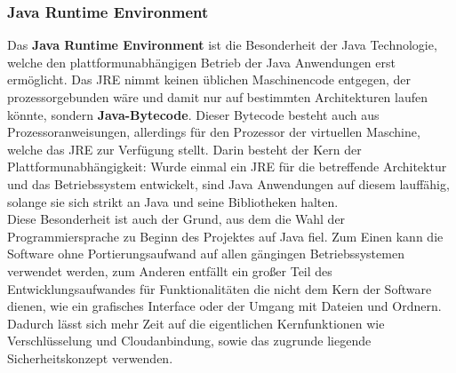 \documentclass[13pt,a4paper,bibliography=totocnumbered,listof=totocnumbered]{scrartcl}
\begin{document}
\subsubsection{Java Runtime Environment}
Das \textbf{Java Runtime Environment} ist die Besonderheit der Java Technologie, welche den plattformunabhängigen Betrieb der Java Anwendungen erst ermöglicht. Das  JRE nimmt keinen üblichen Maschinencode entgegen, der prozessorgebunden wäre und damit nur auf bestimmten Architekturen laufen könnte, sondern \textbf{Java-Bytecode}. Dieser Bytecode besteht auch aus Prozessoranweisungen, allerdings für den Prozessor der virtuellen Maschine, welche das JRE zur Verfügung stellt. Darin besteht der Kern der Plattformunabhängigkeit: Wurde einmal ein JRE für die betreffende Architektur und das Betriebssystem entwickelt, sind Java Anwendungen auf diesem lauffähig, solange sie sich strikt an Java und seine Bibliotheken halten.\\
Diese Besonderheit ist auch der Grund, aus dem die Wahl der Programmiersprache zu Beginn des Projektes auf Java fiel. Zum Einen kann die Software ohne Portierungsaufwand auf allen gängingen Betriebssystemen verwendet werden, zum Anderen entfällt ein großer Teil des Entwicklungsaufwandes für Funktionalitäten die nicht dem Kern der Software dienen, wie ein grafisches Interface oder der Umgang mit Dateien und Ordnern. Dadurch lässt sich mehr Zeit auf die eigentlichen Kernfunktionen wie Verschlüsselung und Cloudanbindung,  sowie das zugrunde liegende Sicherheitskonzept verwenden. \\
\cite[S. 63f]{3}
\end{document}
